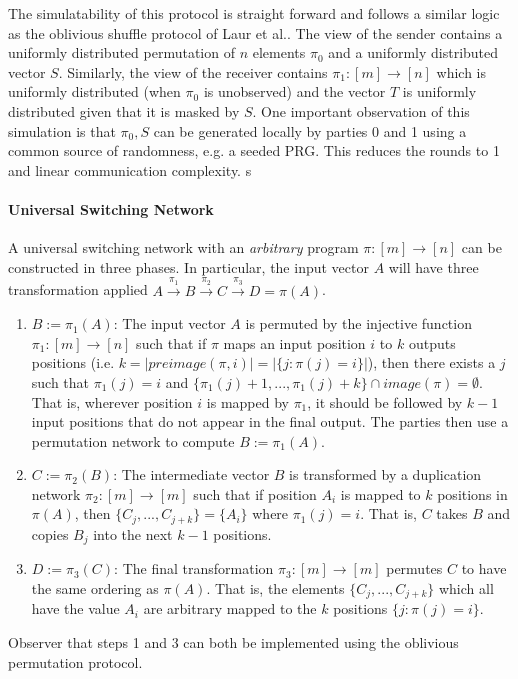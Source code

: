 The simulatability of this protocol is straight forward and follows a similar logic as the oblivious shuffle protocol of Laur et al.\cite{LWZ11}. The view of the sender contains a uniformly distributed permutation of $n$ elements $\pi_0$ and a uniformly distributed vector $S$. Similarly, the view of the receiver contains $\pi_1: [m]\rightarrow [n]$ which is uniformly distributed (when $\pi_0$ is unobserved) and the vector $T$ is uniformly distributed given that it is masked by $S$. One important observation of this simulation is that $\pi_0,S$ can be generated locally by parties 0 and 1 using a common source of randomness, e.g. a seeded PRG. This reduces the rounds to 1 and linear communication complexity. 
s
\paragraph{Universal Switching Network}

A universal switching network with an \emph{arbitrary} program $\pi : [m]\rightarrow [n]$ can be constructed in three phases\cite{MS13, CMRS18}. In particular, the input vector $A$ will have three transformation applied $A\overset{\pi_1}{\rightarrow}B\overset{\pi_2}{\rightarrow}C\overset{\pi_3}{\rightarrow}D=\pi(A)$.
\begin{enumerate}
	\item $B:=\pi_1(A)$:  The input vector $A$ is permuted by the injective function $\pi_1:[m]\rightarrow[n]$ such that if $\pi$ maps an input position $i$ to $k$ outputs positions (i.e. $k=|preimage(\pi,i)|=|\{ j : \pi(j)=i \}|$), then there exists a $j$ such that $\pi_1(j)=i$  and $\{\pi_1(j)+ 1,...,\pi_1(j )+k \} \cap image(\pi) = \emptyset$. That is, wherever position $i$ is mapped by $\pi_1$, it should be followed by $k-1$ input positions that do not appear in the final output. The parties then use a permutation network to compute $B:=\pi_1(A)$.
	
	\item $C:=\pi_2(B)$: The intermediate vector $B$ is transformed by a duplication network $\pi_2:[m]\rightarrow[m]$ such that if position $A_i$ is mapped to $k$ positions in $\pi(A)$, then $\{ C_{j},...,C_{j+k}\} = \{A_i\}$ where $\pi_1(j)=i$. That is, $C$ takes $B$ and copies $B_{j}$ into the next $k-1$ positions. 
	
	\item $D:=\pi_3(C)$: The final transformation $\pi_3:[m]\rightarrow[m]$  permutes $C$ to have the same ordering as $\pi(A)$. That is, the elements $\{ C_{j},...,C_{j+k}\}$ which all have the value  $A_i$ are arbitrary mapped to the $k$ positions $\{ j : \pi(j)=i \}$.
\end{enumerate}
Observer that steps 1 and 3 can both be implemented using the oblivious permutation protocol.%

